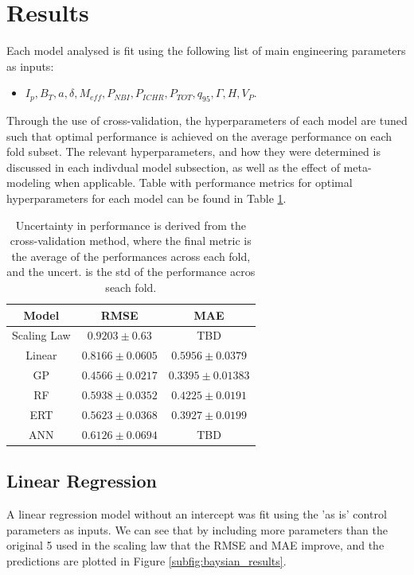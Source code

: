 \documentclass[a4paper, twoside, final, 12pt]{article}
\begin{document}
\section{Results}{\label{sec:results_1}
Each model analysed is fit using the following list of main engineering parameters as inputs:
\begin{itemize}
        \item $I_p, B_T, a, \delta, M_{eff}, P_{NBI}, P_{ICHR}, P_{TOT}, q_{95}, \Gamma, H, V_P$.
\end{itemize}
Through the use of cross-validation, the hyperparameters of each model are tuned such that optimal performance is achieved on the average performance on each fold subset.
The relevant hyperparameters, and how they were determined is discussed in each indivdual model subsection, as well as the effect of meta-modeling when applicable.
Table with performance metrics for optimal hyperparameters for each model can be found in Table \ref{tab:performance_models}.

\begin{table}
	\begin{center}
		\begin{tabular}{| c | c | c |}
		\hline
		Model & RMSE & MAE \\
		\hline
		Scaling Law & $0.9203 \pm 0.63$ & TBD \\
		\hline
		Linear & $0.8166 \pm 0.0605 $ & $0.5956 \pm 0.0379$ \\
		GP & $0.4566 \pm  0.0217$ &  $0.3395 \pm 0.01383$\\
		RF & $0.5938 \pm 0.0352$ & $0.4225 \pm 0.0191$ \\
		ERT &$0.5623 \pm 0.0368 $ & $0.3927 \pm 0.0199$ \\
		ANN & $0.6126 \pm 0.0694$ & TBD \\
		\hline
		\end{tabular}
		\caption{Uncertainty in performance is derived from the cross-validation method, where the final metric is the average of the performances across each fold, and the uncert. is the std of the performance acros seach fold.}
		\label{tab:performance_models}
	\end{center}
\end{table}

\subsection{Linear Regression}
A linear regression model without an intercept was fit using the 'as is' control parameters as inputs.
We can see that by including more parameters than the original 5 used in the scaling law that the RMSE and MAE improve, and the predictions are plotted in Figure \ref{subfig:baysian_results}.

}
\end{document}
